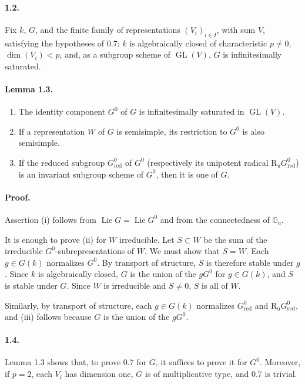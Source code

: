 \documentclass[11pt]{article}
\newcommand{\Ga}{\mathbb{G}_a}
\newcommand{\Lie}{\operatorname{Lie}}
\newcommand{\GL}{\operatorname{GL}}
\newcommand{\Ru}{\operatorname{R_u}}
\newcommand{\red}{\mathrm{red}}
\theoremstyle{plain}
\theoremstyle{definition}
\begin{document}
\paragraph{1.2.} Fix $k$, $G$, and the finite family of representations $(V_i)_{i\in I}$, with sum $V$, satisfying the hypotheses of 0.7: $k$ is algebraically closed of characteristic $p\ne0$, $\dim(V_i)<p$, and, as a subgroup scheme of $\GL(V)$, $G$ is infinitesimally saturated.

\paragraph{Lemma 1.3.}
\begin{enumerate}[label=(\roman*)]
\item The identity component $G^0$ of $G$ is infinitesimally saturated in $\GL(V)$.
\item If a representation $W$ of $G$ is semisimple, its restriction to $G^0$ is also semisimple.
\item If the reduced subgroup $G^0_{\red}$ of $G^0$ (respectively its unipotent radical $\Ru G^0_{\red}$) is an invariant subgroup scheme of $G^0$, then it is one of $G$.
\end{enumerate}

\paragraph{Proof.} Assertion (i) follows from $\Lie G=\Lie G^0$ and from the connectedness of $\Ga$.

It is enough to prove (ii) for $W$ irreducible. Let $S\subset W$ be the sum of the irreducible $G^0$-subrepresentations of $W$. We must show that $S=W$. Each $g\in G(k)$ normalizes $G^0$. By transport of structure, $S$ is therefore stable under $g$. Since $k$ is algebraically closed, $G$ is the union of the $gG^0$ for $g\in G(k)$, and $S$ is stable under $G$. Since $W$ is irreducible and $S\ne0$, $S$ is all of $W$.

Similarly, by transport of structure, each $g\in G(k)$ normalizes $G^0_{\red}$ and $\Ru G^0_{\red}$, and (iii) follows because $G$ is the union of the $gG^0$.

\paragraph{1.4.} Lemma 1.3 shows that, to prove 0.7 for $G$, it suffices to prove it for $G^0$. Moreover, if $p=2$, each $V_i$ has dimension one, $G$ is of multiplicative type, and 0.7 is trivial.
\end{document}
